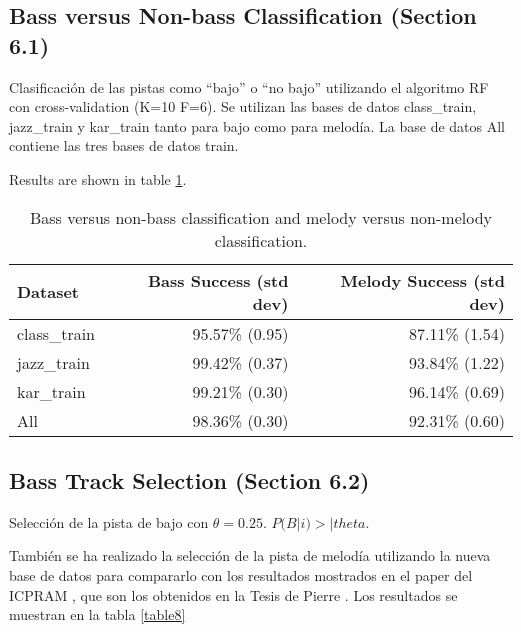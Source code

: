 \documentclass{article}
\begin{document}
\subsection{Bass versus Non-bass Classification (Section 6.1)}

Clasificación de las pistas como “bajo” o “no bajo” utilizando el algoritmo RF con cross-validation (K=10 F=6). Se utilizan las bases de datos class\_train, jazz\_train y kar\_train tanto para bajo como para melodía. La base de datos All contiene las tres bases de datos train.

Results are shown in table \ref{table7}.

\begin{table}
\begin{center}
\begin{tabular}{  l | r | r }
\hline
Dataset & Bass Success (std dev) & Melody Success (std dev) \\
\hline
\hline
class\_train & 95.57\% (0.95) & 87.11\% (1.54) \\
jazz\_train & 99.42\% (0.37) & 93.84\% (1.22) \\
kar\_train & 99.21\% (0.30) & 96.14\% (0.69) \\
All & 98.36\% (0.30) & 92.31\% (0.60) \\
\hline
\end{tabular}
\caption{Bass versus non-bass classification and melody versus non-melody classification.}
\label{table7}
\end{center}
\end{table}




\subsection{Bass Track Selection (Section 6.2)}

Selección de la pista de bajo con $\theta=0.25$. $P(B|i) > |theta$.

También se ha realizado la selección de la pista de melodía utilizando la nueva base de datos para compararlo con los resultados mostrados en el paper del ICPRAM \cite{vicente2012bass}, que son los obtenidos en la Tesis de Pierre \cite{de2011statistical}. Los resultados se muestran en la tabla \ref{table8}
\end{document}
